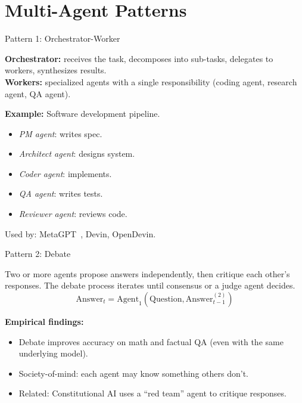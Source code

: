 \documentclass[aspectratio=169,10pt]{beamer}
\begin{document}
\section{Multi-Agent Patterns}

\begin{frame}{Pattern 1: Orchestrator-Worker}
  \begin{tcolorbox}[hitbox, title=Orchestrator-Worker Pattern]
    \textbf{Orchestrator:} receives the task, decomposes into sub-tasks, delegates to workers, synthesizes results.\\[4pt]
    \textbf{Workers:} specialized agents with a single responsibility (coding agent, research agent, QA agent).
  \end{tcolorbox}
  \vspace{0.4em}
  \textbf{Example:} Software development pipeline.
  \begin{itemize}
    \item \textit{PM agent}: writes spec.
    \item \textit{Architect agent}: designs system.
    \item \textit{Coder agent}: implements.
    \item \textit{QA agent}: writes tests.
    \item \textit{Reviewer agent}: reviews code.
  \end{itemize}
  Used by: MetaGPT~\cite{hong2023metagpt}, Devin, OpenDevin.
\end{frame}

\begin{frame}{Pattern 2: Debate}
  \begin{tcolorbox}[hitbox, title=Multi-Agent Debate (Du et al.\ 2023)]
    Two or more agents propose answers independently, then critique each other's responses.
    The debate process iterates until consensus or a judge agent decides.
    \[
      \text{Answer}_t = \text{Agent}_1(\text{Question}, \text{Answer}_{t-1}^{(2)})
    \]
  \end{tcolorbox}
  \vspace{0.4em}
  \textbf{Empirical findings:}
  \begin{itemize}
    \item Debate improves accuracy on math and factual QA (even with the same underlying model).
    \item Society-of-mind: each agent may know something others don't.
    \item Related: Constitutional AI uses a ``red team'' agent to critique responses.
  \end{itemize}
\end{frame}
\end{document}
